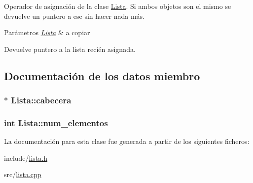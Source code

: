 Operador de asignación de la clase \hyperlink{class_lista}{Lista}. Si ambos objetos son el mismo se devuelve un puntero a ese sin hacer nada más. 


\begin{DoxyParams}{Parámetros}
{\em \hyperlink{class_lista}{Lista}} & a copiar \\
\hline
\end{DoxyParams}
\begin{DoxyReturn}{Devuelve}
puntero a la lista recién asignada. 
\end{DoxyReturn}


\subsection{Documentación de los datos miembro}
\hypertarget{class_lista_a3a8e4a0637c6c328a00acc4b186f34a2}{}
\subsubsection[{cabecera}]{$\ast$ Lista\+::cabecera\hspace{0.3cm}{\ttfamily [private]}}\label{class_lista_a3a8e4a0637c6c328a00acc4b186f34a2}
\hypertarget{class_lista_ad88ae756eb0ea2e6d3046335c5a44db8}{}
\subsubsection[{num\+\_\+elementos}]{\setlength{\rightskip}{0pt plus 5cm}int Lista\+::num\+\_\+elementos\hspace{0.3cm}{\ttfamily [private]}}\label{class_lista_ad88ae756eb0ea2e6d3046335c5a44db8}


La documentación para esta clase fue generada a partir de los siguientes ficheros\+:\begin{DoxyCompactItemize}
\item 
include/\hyperlink{lista_8h}{lista.\+h}\item 
src/\hyperlink{lista_8cpp}{lista.\+cpp}\end{DoxyCompactItemize}
